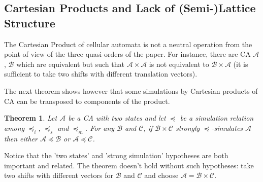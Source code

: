 \documentclass[a4paper]{elsarticle}
\newcommand{\ACA}{\mathcal{A}}
\newcommand{\ACB}{\mathcal{B}}
\newcommand{\ACC}{\mathcal{C}}
\newcommand{\simu}{\preccurlyeq}
\newcommand{\sacsimu}{\simu_i}
\newcommand{\facsimu}{\simu_s}
\newcommand{\facsacsimu}{\simu_m}
\newtheorem{thm}{Theorem}[section]
\begin{document}
\subsection{Cartesian Products and Lack of (Semi-)Lattice Structure}
\label{sec:lattice}

The Cartesian Product of cellular automata is not a neutral operation
from the point of view of the three quasi-orders of the paper. For
instance, there are CA $\ACA$, $\ACB$ which are equivalent but such
that ${\ACA\times\ACA}$ is not equivalent to ${\ACB\times\ACA}$ (it is
sufficient to take two shifts with different translation vectors).

The next theorem shows however that some simulations by Cartesian
products of CA can be transposed to components of the product. 

\begin{thm}
  \label{thm:deprod}
  Let $\ACA$ be a CA with two states and let $\simu$ be a simulation
  relation among $\sacsimu$, $\facsimu$ and $\facsacsimu$. For any
  $\ACB$ and $\ACC$, if ${\ACB\times\ACC}$ strongly $\simu$-simulates
  $\ACA$ then either ${\ACA\simu\ACB}$ or ${\ACA\simu\ACC}$.
\end{thm}

Notice that the 'two states' and 'strong simulation' hypotheses are
both important and related. The theorem doesn't hold without such
hypotheses: take two shifts with different vectors for $\ACB$ and
$\ACC$ and choose $\ACA=\ACB\times\ACC$.
\end{document}
